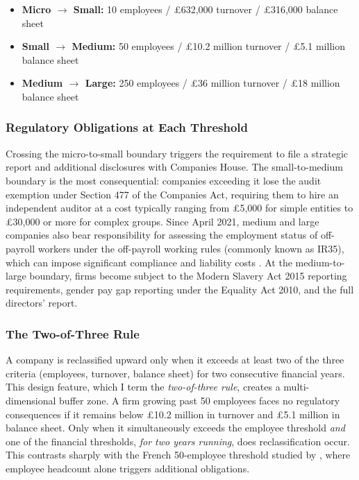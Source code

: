 \documentclass[12pt]{article}
\begin{document}
\begin{itemize}
\item \textbf{Micro $\to$ Small:} 10 employees / \pounds632,000 turnover / \pounds316,000 balance sheet
\item \textbf{Small $\to$ Medium:} 50 employees / \pounds10.2 million turnover / \pounds5.1 million balance sheet
\item \textbf{Medium $\to$ Large:} 250 employees / \pounds36 million turnover / \pounds18 million balance sheet
\end{itemize}

\subsubsection*{Regulatory Obligations at Each Threshold} Crossing the micro-to-small boundary triggers the requirement to file a strategic report and additional disclosures with Companies House. The small-to-medium boundary is the most consequential: companies exceeding it lose the audit exemption under Section 477 of the Companies Act, requiring them to hire an independent auditor at a cost typically ranging from \pounds5,000 for simple entities to \pounds30,000 or more for complex groups. Since April 2021, medium and large companies also bear responsibility for assessing the employment status of off-payroll workers under the off-payroll working rules (commonly known as IR35), which can impose significant compliance and liability costs \citep{hmrc2020ir35}. At the medium-to-large boundary, firms become subject to the Modern Slavery Act 2015 reporting requirements, gender pay gap reporting under the Equality Act 2010, and the full directors' report.

\subsubsection*{The Two-of-Three Rule} A company is reclassified upward only when it exceeds at least two of the three criteria (employees, turnover, balance sheet) for two consecutive financial years. This design feature, which I term the \textit{two-of-three rule}, creates a multi-dimensional buffer zone. A firm growing past 50 employees faces no regulatory consequences if it remains below \pounds10.2 million in turnover and \pounds5.1 million in balance sheet. Only when it simultaneously exceeds the employee threshold \textit{and} one of the financial thresholds, \textit{for two years running}, does reclassification occur. This contrasts sharply with the French 50-employee threshold studied by \citet{garicano2016}, where employee headcount alone triggers additional obligations.
\end{document}
